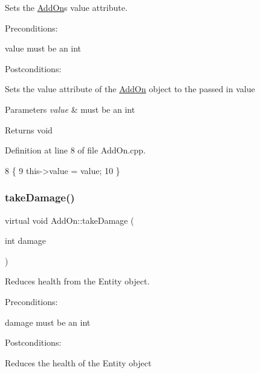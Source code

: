 Sets the \hyperlink{classAddOn}{Add\+On}\textquotesingle{}s value attribute. 

Preconditions\+:
\begin{DoxyItemize}
\item value must be an int
\end{DoxyItemize}

Postconditions\+:
\begin{DoxyItemize}
\item Sets the value attribute of the \hyperlink{classAddOn}{Add\+On} object to the passed in value
\end{DoxyItemize}


\begin{DoxyParams}{Parameters}
{\em value} & must be an int \\
\hline
\end{DoxyParams}
\begin{DoxyReturn}{Returns}
void 
\end{DoxyReturn}


Definition at line 8 of file Add\+On.\+cpp.


\begin{DoxyCode}
8                               \{
9     this->value = value;
10 \}
\end{DoxyCode}
\mbox{\label{classAddOn_ab3aefbc00969fe613ed6d42c4f55c5a2}} 
\subsubsection{\texorpdfstring{take\+Damage()}{takeDamage()}}
{\footnotesize\ttfamily virtual void Add\+On\+::take\+Damage (\begin{DoxyParamCaption}\item[{int}]{damage }\end{DoxyParamCaption})\hspace{0.3cm}{\ttfamily [pure virtual]}}



Reduces health from the Entity object. 

Preconditions\+:
\begin{DoxyItemize}
\item damage must be an int
\end{DoxyItemize}

Postconditions\+:
\begin{DoxyItemize}
\item Reduces the health of the Entity object
\end{DoxyItemize}


